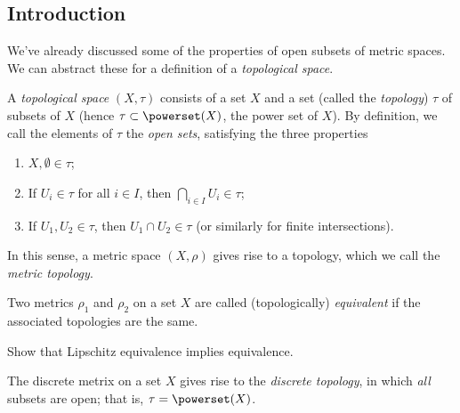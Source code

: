 \setcounter{lecture}{2}

\subsection{Introduction} %
\label{sub:top_introduction}

We've already discussed some of the properties of open subsets of metric spaces. We can abstract these for a definition of a \emph{topological space}.

\begin{definition}
	A \emph{topological space} $(X,\tau)$ consists of a set $X$ and a set (called the \emph{topology}) $\tau$ of subsets of $X$ (hence $\tau \subset \powerset(X)$, the power set of $X$). By definition, we call the elements of $\tau$ the \emph{open sets}, satisfying the three properties
	\begin{enumerate}
		\shortskip
		\item $X,\emptyset \in \tau$;
		\item If $U_i \in \tau$ for all $i\in I$, then $\bigcap_{i\in I} U_i \in \tau$;
		\item If $U_1, U_2 \in \tau$, then $U_1 \cap U_2 \in \tau$ (or similarly for finite intersections).
	\end{enumerate}
	In this sense, a metric space $(X,\rho)$ gives rise to a topology, which we call the \emph{metric topology}.

	Two metrics $\rho_1$ and $\rho_2$ on a set $X$ are called (topologically) \emph{equivalent} if the associated topologies are the same.
\end{definition}

\begin{exercise}
	Show that Lipschitz equivalence implies equivalence.
\end{exercise}

\begin{example}
	The discrete metrix on a set $X$ gives rise to the \emph{discrete topology}, in which \emph{all} subsets are open; that is, $\tau = \powerset(X)$.
\end{example}

